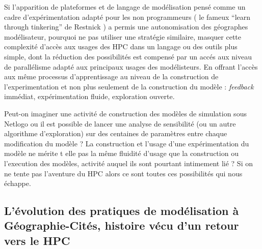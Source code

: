 Si l'apparition de plateformes et de langage de modélisation pensé comme un cadre d'expérimentation adapté pour les non programmeurs ( le fameux \foreignquote{english}{learn through tinkering} de Restnick ) a permis une autonomisation des géographes modélisateur, pourquoi ne pas utiliser une stratégie similaire, masquer cette complexité d'accès aux usages des HPC dans un langage ou des outils plus simple, dont la réduction des possibilités est compensé par un accés aux niveau de parallélisme adapté aux principaux usages des modélisteurs. En offrant l'accès aux même processus d'apprentissage au niveau de la construction de l'experimentation et non plus seulement de la construction du modèle : \textit{feedback} immédiat, expérimentation fluide, exploration ouverte.

Peut-on imaginer une activité de construction des modèles de simulation sous Netlogo ou il est possible de lancer une analyse de sensibilité (ou un autre algorithme d'exploration) sur des centaines de paramètres entre chaque modification du modèle ? La construction et l'usage d'une expérimentation du modèle ne mérite t elle pas la même fluidité d'usage que la construction ou l'execution des modèles, activité auquel ils sont pourtant intimement lié ? Si on ne tente pas l'aventure du HPC alors ce sont toutes ces possibilités qui nous échappe.

\subsection{L'évolution des pratiques de modélisation à Géographie-Cités, histoire vécu d'un retour vers le HPC}
\label{ssec:hist_pratiques}




